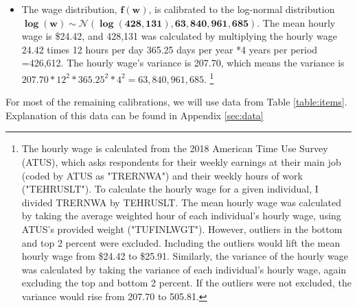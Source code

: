 \documentclass[letter, 12pt, epsf,leqno]{article}
\begin{document}
\begin{itemize}
\item The wage distribution, $\boldsymbol{f(w)}$, is calibrated to the log-normal distribution $\boldsymbol{\log(w)\sim \mathcal{N}(\log(428,131), 63,840,961,685)}$.  The mean hourly wage is \$24.42, and 428,131 was calculated by multiplying the hourly wage 24.42 times 12 hours per day 365.25 days per year *4 years per period =426,612.  The hourly wage's variance is 207.70, which means the variance is $207.70*12^2*365.25^2*4^2=63,840,961,685.$
\footnote{
The hourly wage is calculated from the 2018 American Time Use Survey (ATUS), which asks respondents for their weekly earnings at their main job (coded by ATUS as "TRERNWA") and their weekly hours of work ("TEHRUSLT").  To calculate the hourly wage for a given individual, I divided TRERNWA by  TEHRUSLT.  The mean hourly wage was calculated by taking the average weighted hour of each individual's hourly wage, using ATUS's provided weight ("TUFINLWGT").  However, outliers in the bottom and top 2 percent were excluded.  Including the outliers would lift the mean hourly wage from \$24.42 to \$25.91.  Similarly, the variance of the hourly wage was calculated by taking the variance of each individual's hourly wage, again excluding the top and bottom 2 percent.  If the outliers were not excluded, the variance would rise from 207.70 to 505.81.}



\end{itemize}




For most of the remaining calibrations, we will use data from Table \ref{table:items}.  Explanation of this data can be found in Appendix \ref{sec:data} %
\end{document}
